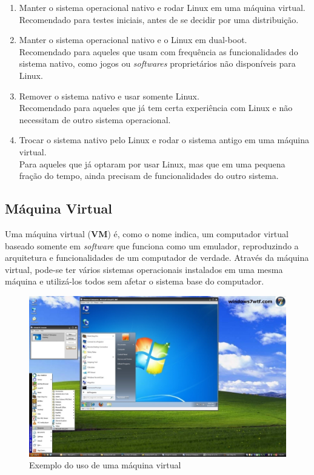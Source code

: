 \documentclass{handout_utfpr}
\begin{document}
\begin{enumerate}
\item Manter o sistema operacional nativo e rodar Linux em uma máquina virtual.\\
  Recomendado para testes iniciais, antes de se decidir por uma distribuição.

\item Manter o sistema operacional nativo e o Linux em dual-boot.\\
  Recomendado para aqueles que usam com frequência as funcionalidades do sistema nativo, como jogos ou \textit{softwares} proprietários não disponíveis para Linux.

\item Remover o sistema nativo e usar somente Linux.\\
  Recomendado para aqueles que já tem certa experiência com Linux e não necessitam de outro sistema operacional.

\item Trocar o sistema nativo pelo Linux e rodar o sistema antigo em uma máquina virtual.\\
  Para aqueles que já optaram por usar Linux, mas que em uma pequena fração do tempo, ainda precisam de funcionalidades do outro sistema.
\end{enumerate}

\subsection{Máquina Virtual}

Uma máquina virtual (\textbf{VM}) é, como o nome indica, um computador virtual baseado somente em \emph{software} que funciona como um emulador, reproduzindo a arquitetura e funcionalidades de um computador de verdade. Através da máquina virtual, pode-se ter vários sistemas operacionais instalados em uma mesma máquina e utilizá-los todos sem afetar o sistema base do computador.

\begin{figure}[!h]
  \centering
  \includegraphics[scale=.3]{imagens/vm.jpg}
  \caption{Exemplo do uso de uma máquina virtual}
  \label{fig:vm}
\end{figure}
\end{document}

